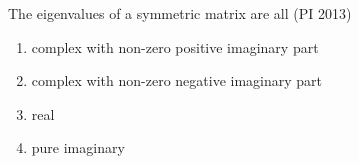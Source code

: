 \item The eigenvalues of a symmetric matrix are all
\hfill (PI 2013)
\begin{enumerate}
\item complex with non-zero positive imaginary part 
\item complex with non-zero negative imaginary part 
\item real
\item pure imaginary 
\end{enumerate} 
